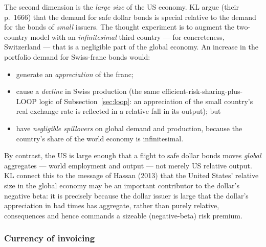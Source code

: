 The second dimension is the \emph{large size} of the US economy. KL argue (their
p.~1666) that the demand for safe dollar bonds is special relative to the demand
for the bonds of \emph{small} issuers. The thought experiment is to augment the
two-country model with an \emph{infinitesimal} third country --- for concreteness,
Switzerland --- that is a negligible part of the global economy. An increase in
the portfolio demand for Swiss-franc bonds would:
\begin{itemize}[leftmargin=1.8em,itemsep=2pt]
  \item generate an \emph{appreciation} of the franc;
  \item cause a \emph{decline} in Swiss production (the same
  efficient-risk-sharing-plus-LOOP logic of Subsection~\ref{sec:loop}: an
  appreciation of the small country's real exchange rate is reflected in a
  relative fall in its output); but
  \item have \emph{negligible spillovers} on global demand and production, because
  the country's share of the world economy is infinitesimal.
\end{itemize}
By contrast, the US is large enough that a flight to safe dollar bonds moves
\emph{global} aggregates --- world employment and output --- not merely US relative
output. KL connect this to the message of Hassan (2013) that the United States'
relative size in the global economy may be an important contributor to the
dollar's negative beta: it is precisely because the dollar issuer is large that
the dollar's appreciation in bad times has aggregate, rather than purely relative,
consequences and hence commands a sizeable (negative-beta) risk premium.

\subsubsection{Currency of invoicing}
\label{sec:invoicing}

